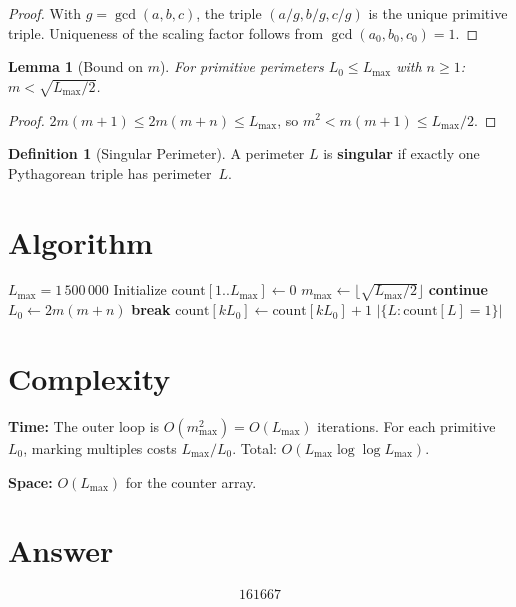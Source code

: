 \documentclass[12pt,a4paper]{article}
\newtheorem{lemma}[theorem]{Lemma}
\theoremstyle{definition}
\newtheorem{definition}[theorem]{Definition}
\begin{document}
\begin{proof}
With $g = \gcd(a,b,c)$, the triple $(a/g, b/g, c/g)$ is the unique primitive triple. Uniqueness of the scaling factor follows from $\gcd(a_0, b_0, c_0) = 1$.
\end{proof}

\begin{lemma}[Bound on $m$]
For primitive perimeters $L_0 \leq L_{\max}$ with $n \geq 1$: $m < \sqrt{L_{\max}/2}$.
\end{lemma}

\begin{proof}
$2m(m+1) \leq 2m(m+n) \leq L_{\max}$, so $m^2 < m(m+1) \leq L_{\max}/2$.
\end{proof}

\begin{definition}[Singular Perimeter]
A perimeter $L$ is \textbf{singular} if exactly one Pythagorean triple has perimeter~$L$.
\end{definition}

\section{Algorithm}

\begin{algorithm}[H]
\caption{Count singular perimeters $\leq L_{\max}$}
\begin{algorithmic}[1]
\Require $L_{\max} = 1\,500\,000$
\State Initialize $\mathrm{count}[1..L_{\max}] \gets 0$
\State $m_{\max} \gets \lfloor\sqrt{L_{\max}/2}\rfloor$
         \textbf{continue} \EndIf
        \State $L_0 \gets 2m(m + n)$
         \textbf{break} \EndIf
            \State $\mathrm{count}[kL_0] \gets \mathrm{count}[kL_0] + 1$
        \EndFor
    \EndFor
\EndFor
\State \Return $|\{L : \mathrm{count}[L] = 1\}|$
\end{algorithmic}
\end{algorithm}

\section{Complexity}

\textbf{Time:} The outer loop is $O(m_{\max}^2) = O(L_{\max})$ iterations. For each primitive $L_0$, marking multiples costs $L_{\max}/L_0$. Total: $O(L_{\max} \log \log L_{\max})$.

\textbf{Space:} $O(L_{\max})$ for the counter array.

\section{Answer}

\[
\boxed{161667}
\]
\end{document}
